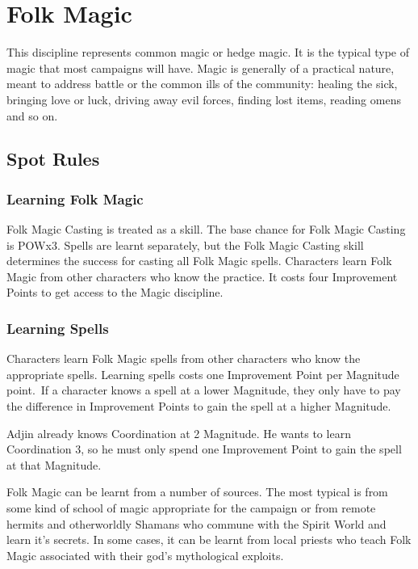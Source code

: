 \chapter{Folk Magic}
\label{ch:magic}

This discipline represents common magic or hedge magic. It is the typical type of magic that most campaigns will have. Magic is generally of a practical nature, meant to address battle or the common ills of the community: healing the sick, bringing love or luck, driving away evil forces, finding lost items, reading omens and so on. 


\section{Spot Rules}

\subsection{Learning Folk Magic}
Folk Magic Casting is treated as a skill. The base chance for Folk Magic Casting is POWx3. Spells are learnt separately, but the Folk Magic Casting skill determines the success for casting all Folk Magic spells. Characters learn Folk Magic from other characters who know the practice. It costs four Improvement Points to get access to the Magic discipline.

\subsection{Learning Spells}
Characters learn Folk Magic spells from other characters who know the appropriate spells. Learning spells costs one Improvement Point per Magnitude point. If a character knows a spell at a lower Magnitude, they only have to pay the difference in Improvement Points to gain the spell at a higher Magnitude.

\begin{rpg-examplebox}
Adjin already knows Coordination at 2 Magnitude. He wants to learn Coordination 3, so he must only spend one Improvement Point to gain the spell at that Magnitude.
\end{rpg-examplebox}


Folk Magic can be learnt from a number of sources. The most typical is from some kind of school of magic appropriate for the campaign or from remote hermits and otherworldly Shamans who commune with the Spirit World and learn it's secrets. In some cases, it can be learnt from local priests who teach Folk Magic associated with their god's mythological exploits.

